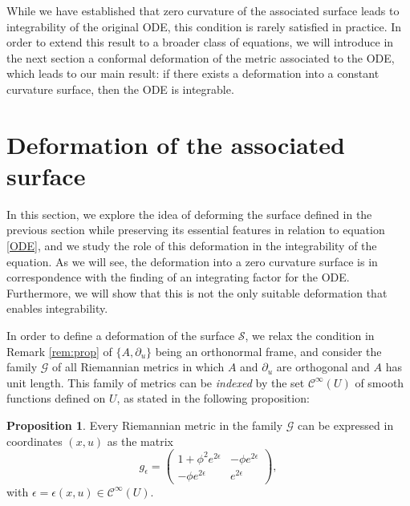 \documentclass{article}
\theoremstyle{remark}
\theoremstyle{definition}
\newtheorem{proposition}[remark]{Proposition}
\begin{document}
\vspace{1cm}

While we have established that zero curvature of the associated surface leads to integrability of the original ODE, this condition is rarely satisfied in practice. In order to extend this result to a broader class of equations, we will introduce in the next section a conformal deformation of the metric associated to the ODE, which leads to our main result: if there exists a deformation into a constant curvature surface, then the ODE is integrable.



\section{Deformation of the associated surface}\label{secDeform}

In this section, we explore the idea of deforming the surface defined in the previous section while preserving its essential features in relation to equation \eqref{ODE}, and we study the role of this deformation in the integrability of the equation. As we will see, the deformation into a zero curvature surface is in correspondence with the finding of an integrating factor for the ODE. Furthermore, we will show that this is not the only suitable deformation that enables integrability.



In order to define a deformation of the surface $\mathcal{S}$, we relax the condition in Remark \ref{rem:prop} of $\{A,\partial_u\}$ being an orthonormal frame, and consider the family $\mathcal{G}$ of all Riemannian metrics in which $A$ and $\partial_u$ are orthogonal and $A$ has unit length. This family of metrics can be \emph{indexed} by the set $\mathcal{C}^{\infty}(U)$ of smooth functions defined on $U$, as stated in the following proposition:
\begin{proposition}
Every Riemannian metric in the family $\mathcal{G}$ can be expressed in coordinates $(x,u)$ as the matrix
\begin{equation}\label{deformations}
g_{\epsilon}=\begin{pmatrix}
1+ \phi^2 e^{2\epsilon} & -\phi e^{2\epsilon}\\
- \phi e^{2\epsilon}  & e^{2\epsilon} 
\end{pmatrix},
\end{equation}
with $\epsilon=\epsilon(x,u) \in\mathcal{C}^{\infty}(U)$.
\end{proposition}
\end{document}
